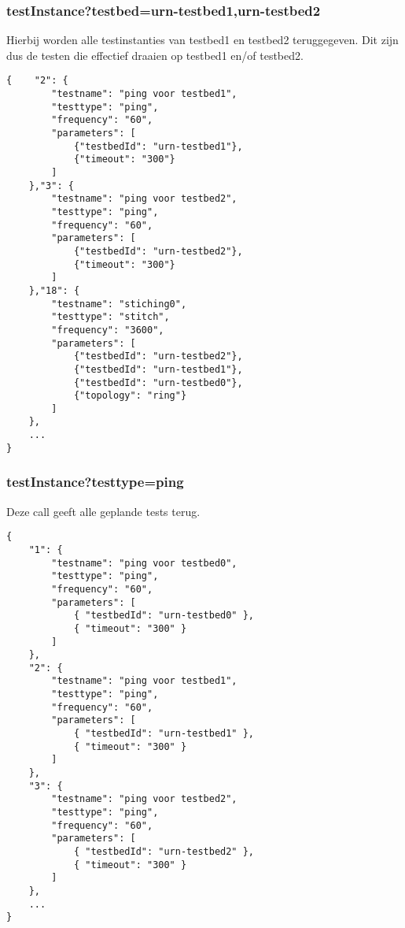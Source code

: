 \subsubsection{testInstance?testbed=urn-testbed1,urn-testbed2}
Hierbij worden alle testinstanties van testbed1 en testbed2 teruggegeven. Dit zijn dus de testen die effectief draaien op testbed1 en/of testbed2.
\begin{verbatim}
{    "2": {
        "testname": "ping voor testbed1",
        "testtype": "ping",
        "frequency": "60",
        "parameters": [
        	{"testbedId": "urn-testbed1"},
            {"timeout": "300"}
        ]
    },"3": {
        "testname": "ping voor testbed2",
        "testtype": "ping",
        "frequency": "60",
        "parameters": [
            {"testbedId": "urn-testbed2"},
            {"timeout": "300"}
        ]
    },"18": {
        "testname": "stiching0",
        "testtype": "stitch",
        "frequency": "3600",
        "parameters": [
            {"testbedId": "urn-testbed2"},
            {"testbedId": "urn-testbed1"},
            {"testbedId": "urn-testbed0"},
            {"topology": "ring"}
        ]
    },	
    ...    
}
\end{verbatim}
\clearpage
\subsubsection{testInstance?testtype=ping}
Deze call geeft alle geplande tests terug.
\begin{verbatim}
{
    "1": {
        "testname": "ping voor testbed0",
        "testtype": "ping",
        "frequency": "60",
        "parameters": [
            { "testbedId": "urn-testbed0" },
            { "timeout": "300" }
        ]
    },
    "2": {
        "testname": "ping voor testbed1",
        "testtype": "ping",
        "frequency": "60",
        "parameters": [
            { "testbedId": "urn-testbed1" },
            { "timeout": "300" }
        ]
    },
    "3": {
        "testname": "ping voor testbed2",
        "testtype": "ping",
        "frequency": "60",
        "parameters": [
            { "testbedId": "urn-testbed2" },
            { "timeout": "300" }
        ]
    },
    ...
}
\end{verbatim}